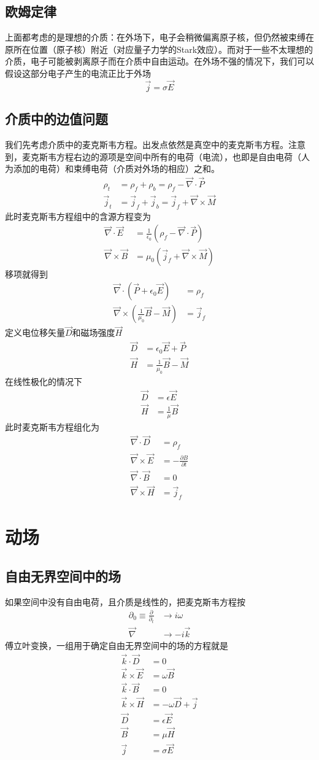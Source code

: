 \documentclass[a4paper,11pt]{ctexart}
\newcommand{\beq}{\begin{equation}}
\newcommand{\eeq}{\end{equation}}
\newcommand{\bea}{\begin{equation}\begin{aligned}}
\newcommand{\eea}{\end{aligned}\end{equation}}
\newcommand{\del}{\vec{\nabla}}
\newcommand{\epv}{\epsilon_0}
\begin{document}
 \subsection{欧姆定律}
 上面都考虑的是理想的介质：在外场下，电子会稍微偏离原子核，但仍然被束缚在原所在位置（原子核）附近（对应量子力学的Stark效应）。而对于一些不太理想的介质，电子可能被剥离原子而在介质中自由运动。在外场不强的情况下，我们可以假设这部分电子产生的电流正比于外场
 \beq
 \vec j = \sigma \vec E
 \eeq
 \subsection{介质中的边值问题}
 我们先考虑介质中的麦克斯韦方程。出发点依然是真空中的麦克斯韦方程。注意到，麦克斯韦方程右边的源项是空间中所有的电荷（电流），也即是自由电荷（人为添加的电荷）和束缚电荷（介质对外场的相应）之和。
 \bea
 \rho_t &= \rho_f + \rho_b  = \rho_f - \del \cdot \vec P\\
\vec{j}_t &= \vec{j}_f + \vec{j}_b = \vec{j}_f + \del \times \vec{M}
\eea
此时麦克斯韦方程组中的含源方程变为
\bea
\del \cdot \vec E &= \frac{1}{\epv}(\rho_f - \del \cdot \vec P) \\
\del \times \vec B &= \mu_0 ( \vec{j}_f + \del \times \vec{M})
\eea
移项就得到
\bea
\del \cdot \left(\vec P  + \epv \vec E \right) &= \rho_f \\
\del \times \left( \frac{1}{\mu_0} \vec B- \vec M\right) &= \vec{j}_f
\eea
定义电位移矢量$\vec D$和磁场强度$\vec H$
\bea
\vec D &= \epv \vec E + \vec P \\
\vec H &= \frac{1}{\mu_0} \vec B - \vec M
\eea
在线性极化的情况下
\bea
\vec D &= \epsilon \vec E\\
\vec H &= \frac{1}{\mu} \vec B
\eea
此时麦克斯韦方程组化为
\bea
\del \cdot \vec D &= \rho_f \\
\del \times \vec E &= - \frac{\partial B}{\partial t} \\
\del \cdot \vec B &= 0 \\
\del \times \vec H &= \vec{j}_f
\eea




\section{动场}
\subsection{自由无界空间中的场}
如果空间中没有自由电荷，且介质是线性的，把麦克斯韦方程按
\bea
\partial_0 \equiv \frac{\partial}{\partial_t} &\to i\omega \\
\del &\to -i\vec k
\eea
傅立叶变换，一组用于确定自由无界空间中的场的方程就是
\bea
\vec k \cdot \vec D &= 0 \\
\vec k \times \vec E &= \omega \vec B \\
\vec k \cdot \vec B &= 0 \\
\vec k \times \vec H &= -\omega \vec D + \vec{j} \\
\vec D &= \epsilon \vec E \\
\vec B &= \mu \vec H \\
\vec j &= \sigma \vec E
\eea
\end{document}
